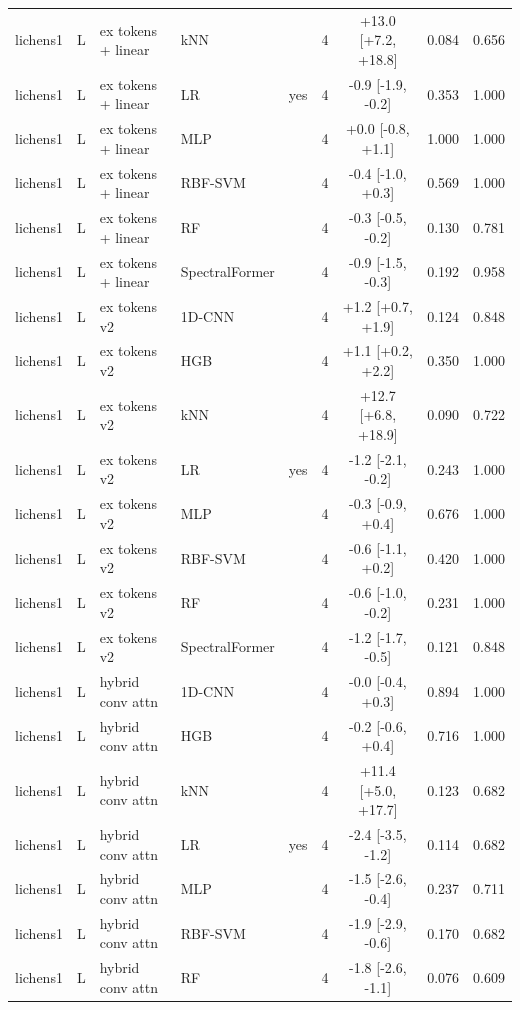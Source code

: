 \begin{tabular}{lllllcccc}
lichens1 & L & ex tokens + linear & kNN &  & 4 & +13.0 [+7.2, +18.8] & 0.084 & 0.656 \\
lichens1 & L & ex tokens + linear & LR & yes & 4 & -0.9 [-1.9, -0.2] & 0.353 & 1.000 \\
lichens1 & L & ex tokens + linear & MLP &  & 4 & +0.0 [-0.8, +1.1] & 1.000 & 1.000 \\
lichens1 & L & ex tokens + linear & RBF-SVM &  & 4 & -0.4 [-1.0, +0.3] & 0.569 & 1.000 \\
lichens1 & L & ex tokens + linear & RF &  & 4 & -0.3 [-0.5, -0.2] & 0.130 & 0.781 \\
lichens1 & L & ex tokens + linear & SpectralFormer &  & 4 & -0.9 [-1.5, -0.3] & 0.192 & 0.958 \\
lichens1 & L & ex tokens v2 & 1D-CNN &  & 4 & +1.2 [+0.7, +1.9] & 0.124 & 0.848 \\
lichens1 & L & ex tokens v2 & HGB &  & 4 & +1.1 [+0.2, +2.2] & 0.350 & 1.000 \\
lichens1 & L & ex tokens v2 & kNN &  & 4 & +12.7 [+6.8, +18.9] & 0.090 & 0.722 \\
lichens1 & L & ex tokens v2 & LR & yes & 4 & -1.2 [-2.1, -0.2] & 0.243 & 1.000 \\
lichens1 & L & ex tokens v2 & MLP &  & 4 & -0.3 [-0.9, +0.4] & 0.676 & 1.000 \\
lichens1 & L & ex tokens v2 & RBF-SVM &  & 4 & -0.6 [-1.1, +0.2] & 0.420 & 1.000 \\
lichens1 & L & ex tokens v2 & RF &  & 4 & -0.6 [-1.0, -0.2] & 0.231 & 1.000 \\
lichens1 & L & ex tokens v2 & SpectralFormer &  & 4 & -1.2 [-1.7, -0.5] & 0.121 & 0.848 \\
lichens1 & L & hybrid conv attn & 1D-CNN &  & 4 & -0.0 [-0.4, +0.3] & 0.894 & 1.000 \\
lichens1 & L & hybrid conv attn & HGB &  & 4 & -0.2 [-0.6, +0.4] & 0.716 & 1.000 \\
lichens1 & L & hybrid conv attn & kNN &  & 4 & +11.4 [+5.0, +17.7] & 0.123 & 0.682 \\
lichens1 & L & hybrid conv attn & LR & yes & 4 & -2.4 [-3.5, -1.2] & 0.114 & 0.682 \\
lichens1 & L & hybrid conv attn & MLP &  & 4 & -1.5 [-2.6, -0.4] & 0.237 & 0.711 \\
lichens1 & L & hybrid conv attn & RBF-SVM &  & 4 & -1.9 [-2.9, -0.6] & 0.170 & 0.682 \\
lichens1 & L & hybrid conv attn & RF &  & 4 & -1.8 [-2.6, -1.1] & 0.076 & 0.609 \\

\end{tabular}
